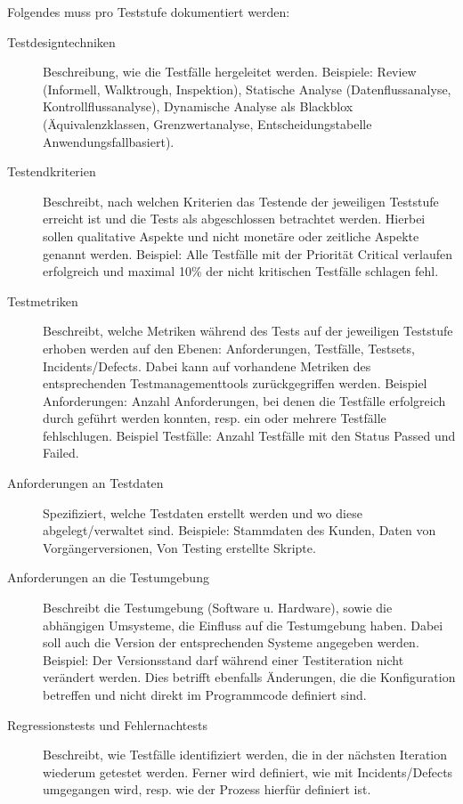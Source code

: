 Folgendes muss pro Teststufe dokumentiert werden:
\begin{description}
	\item[Testdesigntechniken] Beschreibung, wie die Testfälle hergeleitet werden. Beispiele: Review (Informell, Walktrough, Inspektion), Statische Analyse (Datenflussanalyse, Kontrollflussanalyse), Dynamische Analyse als Blackblox (Äquivalenzklassen, Grenzwertanalyse, Entscheidungstabelle Anwendungsfallbasiert).
	
	\item[Testendkriterien] Beschreibt, nach welchen Kriterien das Testende der jeweiligen Teststufe erreicht ist und die Tests als abgeschlossen betrachtet werden. Hierbei sollen qualitative Aspekte und nicht monetäre oder zeitliche Aspekte genannt werden. Beispiel: Alle Testfälle mit der Priorität Critical verlaufen erfolgreich und maximal 10\% der nicht kritischen Testfälle schlagen fehl.
	
	\item[Testmetriken] Beschreibt, welche Metriken während des Tests auf der jeweiligen Teststufe erhoben werden auf den Ebenen: Anforderungen, Testfälle, Testsets, Incidents/Defects. Dabei kann auf vorhandene Metriken des entsprechenden Testmanagementtools zurückgegriffen werden. Beispiel Anforderungen: Anzahl Anforderungen, bei denen die Testfälle erfolgreich durch geführt werden konnten, resp. ein oder mehrere Testfälle fehlschlugen. Beispiel Testfälle: Anzahl Testfälle mit den Status Passed und Failed.
	
	\item[Anforderungen an Testdaten] Spezifiziert, welche Testdaten erstellt werden und wo diese abgelegt/verwaltet sind. Beispiele: Stammdaten des Kunden, Daten von Vorgängerversionen, Von Testing erstellte Skripte.
	
	\item[Anforderungen an die Testumgebung] Beschreibt die Testumgebung (Software u. Hardware), sowie die abhängigen Umsysteme, die Einfluss auf die Testumgebung haben. Dabei soll auch die Version der entsprechenden Systeme angegeben werden. Beispiel: Der Versionsstand darf während einer Testiteration nicht verändert werden. Dies betrifft ebenfalls Änderungen, die die Konfiguration betreffen und nicht direkt im Programmcode definiert sind.
	
	\item[Regressionstests und Fehlernachtests] Beschreibt, wie Testfälle identifiziert werden, die in der nächsten Iteration wiederum getestet werden. Ferner wird definiert, wie mit Incidents/Defects umgegangen wird, resp. wie der Prozess hierfür definiert ist.
\end{description}


